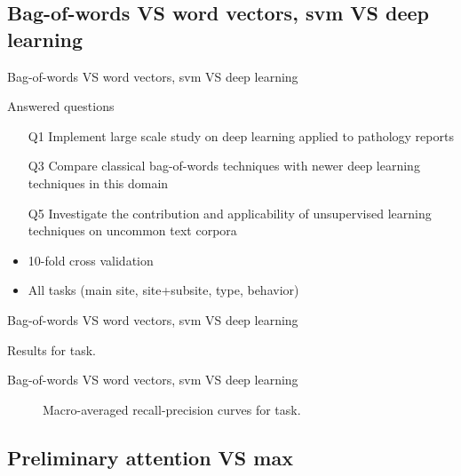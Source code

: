 \subsection{Bag-of-words VS word vectors, \acs{svm} VS deep learning}

\begin{frame}{Bag-of-words VS word vectors, \acs{svm} VS deep learning}
  \begin{block}{Answered questions}
  \begin{itemize}
  \item[Q1] Implement \alert{large scale} study on deep learning
    applied to pathology reports
  \item[Q3] \alert{Compare} classical \alert{bag-of-words} techniques with
    newer deep learning techniques in this domain
  \item[Q5] \alert{Investigate} the contribution and applicability of
    \alert{unsupervised} learning techniques on uncommon text corpora
  \end{itemize}
\end{block}
\begin{itemize}
\item \alert{10-fold} cross validation
\item All tasks (\alert{main} site, \alert{site+subsite}, \alert{type},
  \alert{behavior})
\end{itemize}
\end{frame}

\begin{frame}{Bag-of-words VS word vectors, \acs{svm} VS deep learning}
\begin{table}
  \centering
  \caption{Results for \site{} task.}
  \footnotesize
  
\end{table}
\end{frame}

\begin{frame}{Bag-of-words VS word vectors, \acs{svm} VS deep learning}
\begin{figure}
  \centering
  \resizebox{0.9\textwidth}{!}{}
  \caption{Macro-averaged recall-precision curves for \site{} task.}
\end{figure}

\end{frame}

\subsection{Preliminary attention VS max}

